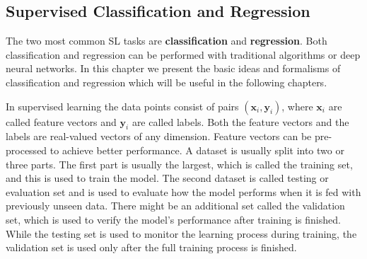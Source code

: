 \documentclass[12pt, a4paper,  nobibnotes]{article}
\begin{document}
\subsection{Supervised Classification and Regression}
The two most common SL tasks are \textbf{classification} and \textbf{regression}. Both classification
and regression can be performed with traditional algorithms or deep neural networks. In this
chapter we present the basic ideas and formalisms of classification and regression which will be 
useful in the following chapters.

In supervised learning the data points consist of pairs $(\mathbf x_i, \mathbf y_i)$, where
$\mathbf x_i$ are called feature vectors and $\mathbf y_i$ are called labels. Both the feature vectors
and the labels are real-valued vectors of any dimension. Feature vectors can be pre-processed to 
achieve better performance. A dataset is usually split into two or three parts. The first part is usually the largest,
which is called the training set, and this is used to train the model. The second dataset 
is called testing or evaluation set and is used to evaluate how the model performs when it is 
fed with previously unseen data. There might be an additional set called the validation set,
which is used to verify the model's performance after training is finished. While the testing 
set is used to monitor the learning process during training, the validation set is used only after
the full training process is finished.
\end{document}
